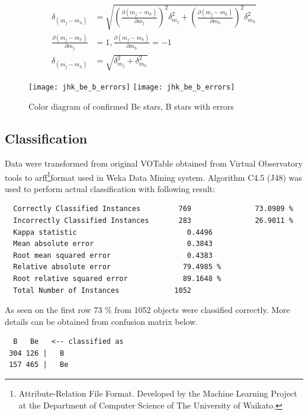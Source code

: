 \begin{align}
\label{eq:error}
  \delta_{(m_j - m_h)} &= \sqrt{\left(\frac{\partial(m_j - m_h) }{\partial
        m_j}\right)^2\delta_{m_j}^2 + \left(\frac{\partial(m_j - m_h) }{\partial
        m_h}\right)^2\delta_{m_h}^2} \\
  \frac{\partial(m_j - m_h) }{\partial m_j } &= 1,\frac{\partial(m_j - m_h)
  }{\partial m_h } = -1 \\
  \delta_{(m_j - m_h)} &= \sqrt{\delta_{m_j}^2 + \delta_{m_h}^2}
\end{align}


    \begin{figure}[!htbp]
      \begin{center}
        \leavevmode
        \ifpdf
        \texttt{[image: jhk\_be\_b\_errors]}
        \else
        \texttt{[image: jhk\_be\_b\_errors]}
        \fi
        \caption{Color diagram of confirmed Be stars, B stars with errors}
        \label{Figjhk_be_b_errors}
      \end{center}
    \end{figure}



\subsection{Classification}
Data were transformed from original VOTable obtained from Virtual
Observatory tools to arff\footnote{Attribute-Relation File
  Format. Developed by the Machine Learning Project at the Department
  of Computer Science of The University of Waikato.}format used in
Weka Data Mining system. Algorithm C4.5 (J48) was used to perform
actual classification with following result:

\begin{lstlisting}
  Correctly Classified Instances         769               73.0989 %
  Incorrectly Classified Instances       283               26.9011 %
  Kappa statistic                          0.4496
  Mean absolute error                      0.3843
  Root mean squared error                  0.4383
  Relative absolute error                 79.4985 %
  Root relative squared error             89.1648 %
  Total Number of Instances             1052
\end{lstlisting}

As seen on the first row 73 \% from  1052 objects were classified
correctly. More details can be obtained from confusion matrix below.

\begin{lstlisting}
  B   Be   <-- classified as
 304 126 |   B
 157 465 |   Be
\end{lstlisting}

